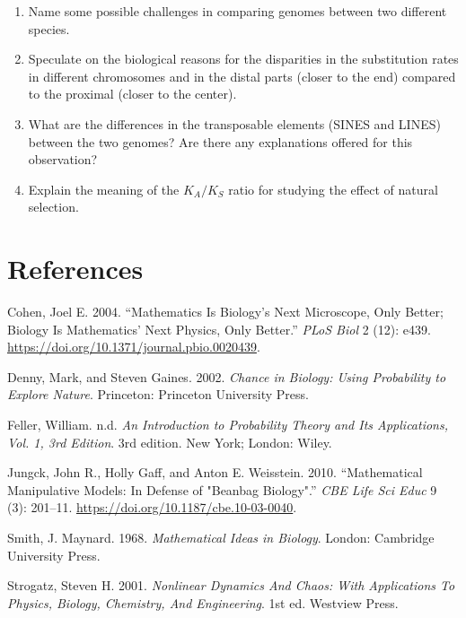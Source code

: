 \documentclass[
  letterpaper,
  DIV=11,
  numbers=noendperiod]{scrreprt}
\newlength{\cslhangindent}
\newlength{\cslentryspacingunit} %
\newenvironment{CSLReferences}[2] %
 {%
  \setlength{\parindent}{0pt}
  \ifodd #1
  \let\oldpar\par
  \def\par{\hangindent=\cslhangindent\oldpar}
  \fi
  \setlength{\parskip}{#2\cslentryspacingunit}
 }%
 {}
\begin{document}
\begin{enumerate}
\def\labelenumi{\arabic{enumi}.}
\item
  Name some possible challenges in comparing genomes between two
  different species.
\item
  Speculate on the biological reasons for the disparities in the
  substitution rates in different chromosomes and in the distal parts
  (closer to the end) compared to the proximal (closer to the center).
\item
  What are the differences in the transposable elements (SINES and
  LINES) between the two genomes? Are there any explanations offered for
  this observation?
\item
  Explain the meaning of the \(K_A/K_S\) ratio for studying the effect
  of natural selection.
\end{enumerate}


\hypertarget{references}{%
\chapter*{References}\label{references}}


\hypertarget{refs}{}
\begin{CSLReferences}{1}{0}
\leavevmode{}%
Cohen, Joel E. 2004. {``Mathematics {Is} {Biology}'s {Next}
{Microscope}, {Only} {Better}; {Biology} {Is} {Mathematics}' {Next}
{Physics}, {Only} {Better}.''} \emph{PLoS Biol} 2 (12): e439.
\url{https://doi.org/10.1371/journal.pbio.0020439}.

\leavevmode{}%
Denny, Mark, and Steven Gaines. 2002. \emph{Chance in {Biology}: {Using}
{Probability} to {Explore} {Nature}}. Princeton: Princeton University
Press.

\leavevmode{}%
Feller, William. n.d. \emph{An {Introduction} to {Probability} {Theory}
and {Its} {Applications}, {Vol}. 1, 3rd {Edition}}. 3rd edition. New
York; London: Wiley.

\leavevmode{}%
Jungck, John R., Holly Gaff, and Anton E. Weisstein. 2010.
{``Mathematical {Manipulative} {Models}: {In} {Defense} of "{Beanbag}
{Biology}".''} \emph{CBE Life Sci Educ} 9 (3): 201--11.
\url{https://doi.org/10.1187/cbe.10-03-0040}.

\leavevmode{}%
Smith, J. Maynard. 1968. \emph{Mathematical {Ideas} in {Biology}}.
London: Cambridge University Press.

\leavevmode{}%
Strogatz, Steven H. 2001. \emph{Nonlinear {Dynamics} {And} {Chaos}:
{With} {Applications} {To} {Physics}, {Biology}, {Chemistry}, {And}
{Engineering}}. 1st ed. Westview Press.

\end{CSLReferences}
\end{document}
